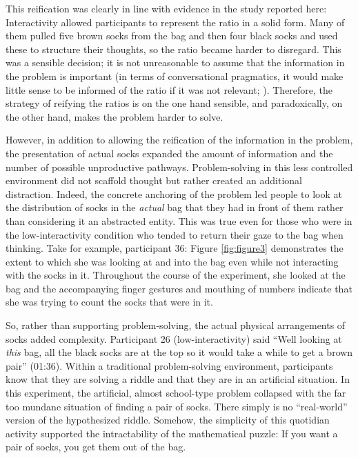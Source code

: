 \documentclass[twocolumn, serif, empirical, authordate]{jote-article}
\begin{document}
This reification was clearly in line with evidence in the study reported here: Interactivity allowed participants to represent the ratio in a solid form. Many of them pulled five brown socks from the bag and then four black socks and used these to structure their thoughts, so the ratio became harder to disregard. This was a sensible decision; it is not unreasonable to assume that the information in the problem is important (in terms of conversational pragmatics, it would make little sense to be informed of the ratio if it was not relevant; ). Therefore, the strategy of reifying the ratios is on the one hand sensible, and paradoxically, on the other hand, makes the problem harder to solve. 

However, in addition to allowing the reification of the information in the problem, the presentation of actual socks expanded the amount of information and the number of possible unproductive pathways. Problem-solving in this less controlled environment did not scaffold thought but rather created an additional distraction. Indeed, the concrete anchoring of the problem led people to look at the distribution of socks in the \emph{actual} bag that they had in front of them rather than considering it an abstracted entity. This was true even for those who were in the low-interactivity condition who tended to return their gaze to the bag when thinking. Take for example, participant 36: Figure \ref{fig:figure3} demonstrates the extent to which she was looking at and into the bag even while not interacting with the socks in it. Throughout the course of the experiment, she looked at the bag and the accompanying finger gestures and mouthing of numbers indicate that she was trying to count the socks that were in it. 

So, rather than supporting problem-solving, the actual physical arrangements of socks added complexity. Participant 26 (low-interactivity) said ``Well looking at \emph{this} bag, all the black socks are at the top so it would take a while to get a brown pair'' (01:36). Within a traditional problem-solving environment, participants know that they are solving a riddle and that they are in an artificial situation. In this experiment, the artificial, almost school-type problem collapsed with the far too mundane situation of finding a pair of socks. There simply is no ``real-world'' version of the hypothesized riddle. Somehow, the simplicity of this quotidian activity supported the intractability of the mathematical puzzle: If you want a pair of socks, you get them out of the bag. 
\end{document}
